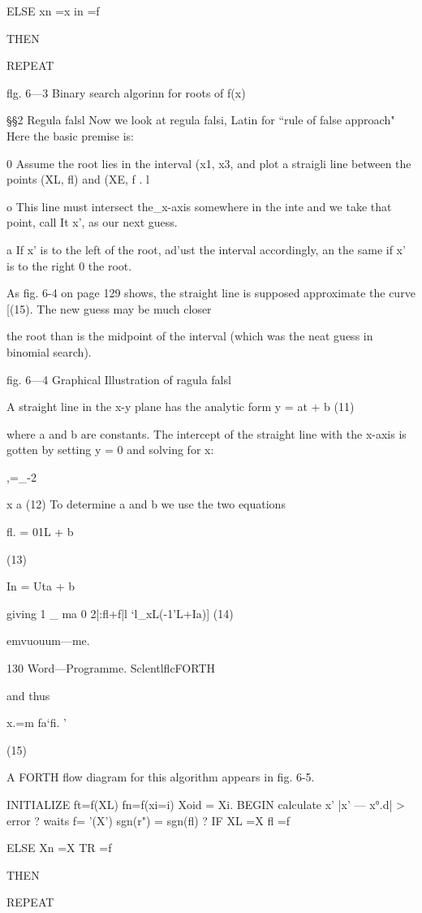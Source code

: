 {ELSE xn =x in =f


THEN

REPEAT

flg. 6—3 Binary search algorinn for roots of f(x)

§§2 Regula falsl
Now we look at regula falsi, Latin for “rule of false approach"
Here the basic premise is:

0 Assume the root lies in the interval (x1, x3, and plot a straigli
line between the points (XL, fl) and (XE, f . l

o This line must intersect the_x-axis somewhere in the inte
and we take that point, call It x’, as our next guess.

a If x’ is to the left of the root, ad'ust the interval accordingly, an
the same if x’ is to the right 0 the root.

As fig. 6-4 on page 129 shows, the straight line is supposed
approximate the curve [(15). The new guess may be much closer

the root than is the midpoint of the interval (which was the neat
guess in binomial search).

fig. 6—4 Graphical Illustration of ragula falsl

A straight line in the x-y plane has the analytic form
y = at + b (11)

where a and b are constants. The intercept of the straight line with
the x-axis is gotten by setting y = 0 and solving for x:

,=_-2

x a (12)
To determine a and b we use the two equations

fl. = 01L + b

(13)

In = Uta + b

giving
1 _ ma
0 2|:fl+f|l ‘l_xL(-1'L+Ia)] (14)

emvuouum—me.

130 Word—Programme. SclentlflcFORTH

and thus

x.=m
fa‘fi. '

(15)

A FORTH flow diagram for this algorithm appears in fig. 6-5.

INITIALIZE
ft=f(XL) fn=f(xi=i)
Xoid = Xi.
BEGIN calculate x’
|x' — x°.d| > error
?
waits
f= '(X’)
sgn(r") = sgn(fl) ?
IF XL =X fl =f

ELSE Xn =X TR =f

THEN

REPEAT

}
